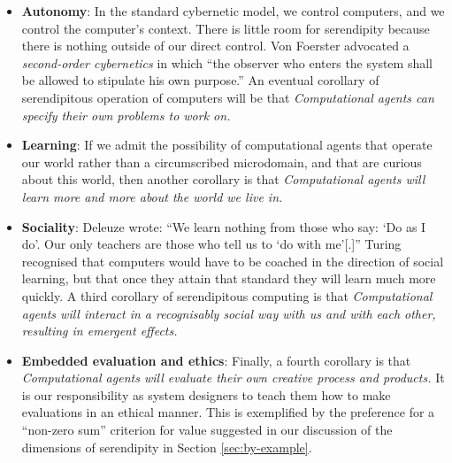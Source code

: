 \begin{itemize}
\item \textbf{Autonomy}: In the standard cybernetic model, we control computers, and we control the computer's context.  There is little room for serendipity because there is nothing outside of our direct control. Von Foerster \citeyear[p. 286]{von2003cybernetics} advocated a \emph{second-order cybernetics} in which ``the observer who enters the system shall be allowed to stipulate his own purpose.'' An eventual corollary of serendipitous operation of computers will be that \emph{Computational agents can specify their own problems to work on.}
\end{itemize}

\begin{itemize}
\item \textbf{Learning}: If we admit the possibility of computational agents that operate our world rather than a circumscribed microdomain, and that are curious about this world, then another corollary is that \emph{Computational agents will learn more and more about the world we live in.}
\end{itemize}

\begin{itemize}
\item \textbf{Sociality}:  Deleuze \citeyear[p. 26]{deleuze1994difference} wrote: ``We learn nothing from those who say: `Do as I do'. Our only teachers are those who tell us to `do with me'[.]''  Turing recognised that computers would have to be coached in the direction of social learning, but that once they attain that standard they will learn much more quickly.  A third corollary of serendipitous computing is that \emph{Computational agents will interact in a recognisably social way with us and with each other, resulting in emergent effects.}
\end{itemize}

\begin{itemize}
\item \textbf{Embedded evaluation and ethics}: Finally, a fourth
  corollary is that \emph{Computational agents will evaluate their own
    creative process and products.}  It is our responsibility as
  system designers to teach them how to make evaluations in an ethical
  manner.  This is exemplified by the preference for a ``non-zero
  sum'' criterion for value suggested in our discussion of the
  dimensions of serendipity in Section \ref{sec:by-example}.
\end{itemize}

